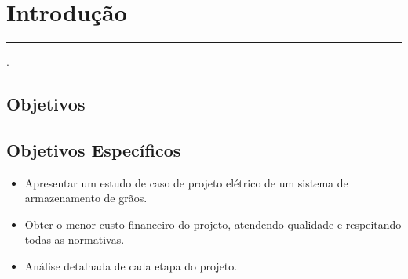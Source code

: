 \chapter{Introdução}\label{chp:intro}
\vspace{-1.5cm}
\noindent\rule{\columnwidth}{1.2mm}
\vspace{0.1cm}

.
\section{Objetivos}

\begin{comment}
O objetivo desse trabalho é avaliar a instalação de uma usina fotovoltaica conectada à rede na Universidade Estadual de Londrina (UEL), sendo ela localizada ao lado da Farmácia Escola, tomando como base o edital $N^o$ 0217/2017, emitido no dia 25/10/2017. 

Para contextualizar, será apresentado os benefícios desse sistema fotovoltaico, demonstrando seus respectivos impactos: sociais, econômicos e ambientais gerados. 
\end{comment}
  

\section{Objetivos Específicos}

\begin{itemize}
\item Apresentar um estudo de caso de projeto elétrico de um sistema de armazenamento de grãos.
\item Obter o menor custo financeiro do projeto, atendendo qualidade e respeitando todas as normativas. 
\item Análise detalhada de cada etapa do projeto.

\end{itemize}

